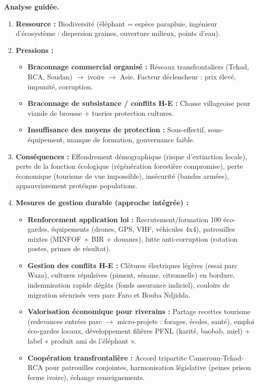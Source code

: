 \documentclass[11pt]{article}
\newcommand{\cle}[1]{{\popxbold\color{popdark}#1}}
\begin{document}
\begin{experience}
\textbf{Analyse guidée.}
\begin{enumerate}
    \item \textbf{Ressource :} Biodiversité (éléphant = \cle{espèce parapluie}, \cle{ingénieur d'écosystème} : dispersion graines, ouverture milieux, points d'eau).
    \item \textbf{Pressions :}
    \begin{itemize}
        \item \textbf{Braconnage commercial organisé :} Réseaux transfrontaliers (Tchad, RCA, Soudan) $\rightarrow$ ivoire $\rightarrow$ Asie. Facteur déclencheur : prix élevé, impunité, corruption.
        \item \textbf{Braconnage de subsistance / conflits H-E :} Chasse villageoise pour viande de brousse + tueries protection cultures.
        \item \textbf{Insuffisance des moyens de protection :} Sous-effectif, sous-équipement, manque de formation, gouvernance faible.
    \end{itemize}
    \item \textbf{Conséquences :} Effondrement démographique (risque d'extinction locale), perte de la fonction écologique (régénération forestière compromise), perte économique (tourisme de vue impossible), insécurité (bandes armées), appauvrissement protéique populations.
    \item \textbf{Mesures de gestion durable (approche intégrée) :}
    \begin{itemize}
        \item \textbf{Renforcement application loi :} Recrutement/formation 100 éco-gardes, équipements (drones, GPS, VHF, véhicules 4x4), patrouilles mixtes (MINFOF + BIR + douanes), lutte anti-corruption (rotation postes, primes de résultat).
        \item \textbf{Gestion des conflits H-E :} Clôtures électriques légères (essai parc Waza), cultures répulsives (piment, sésame, citronnelle) en bordure, indemnisation rapide dégâts (fonds assurance indiciel), couloirs de migration sécurisés vers parc Faro et Bouba Ndjidda.
        \item \textbf{Valorisation économique pour riverains :} Partage recettes tourisme (redevances entrées parc $\rightarrow$ micro-projets : forages, écoles, santé), emploi éco-gardes locaux, développement filières PFNL (karité, baobab, miel) + label « produit ami de l'éléphant ».
        \item \textbf{Coopération transfrontalière :} Accord tripartite Cameroun-Tchad-RCA pour patrouilles conjointes, harmonisation législative (peines prison ferme ivoire), échange renseignements.
    \end{itemize}
\end{enumerate}
\end{experience}
\end{document}
